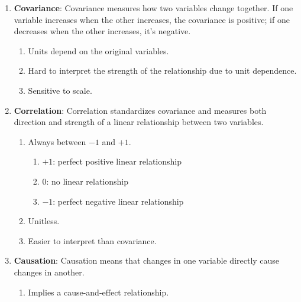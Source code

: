\begin{enumerate}
    \item \textbf{Covariance}: Covariance measures how two variables change together. If one variable increases when the other increases, the covariance is positive; if one decreases when the other increases, it's negative.
    \hfill \cite{common/online/chatgpt}
    \begin{enumerate}
        \item Units depend on the original variables.
        \hfill \cite{common/online/chatgpt}

        \item Hard to interpret the strength of the relationship due to unit dependence.
        \hfill \cite{common/online/chatgpt}

        \item Sensitive to scale.
        \hfill \cite{common/online/chatgpt}
    \end{enumerate}

    \item \textbf{Correlation}: Correlation standardizes covariance and measures both direction and strength of a linear relationship between two variables.
    \hfill \cite{common/online/chatgpt}
    \begin{enumerate}
        \item Always between $-1$ and $+1$.
        \hfill \cite{common/online/chatgpt}

        \begin{enumerate}
            \item $+1$: perfect positive linear relationship
            \hfill \cite{common/online/chatgpt}

            \item $0$: no linear relationship
            \hfill \cite{common/online/chatgpt}

            \item $-1$: perfect negative linear relationship
            \hfill \cite{common/online/chatgpt}
        \end{enumerate}

        \item Unitless.
        \hfill \cite{common/online/chatgpt}

        \item Easier to interpret than covariance.
        \hfill \cite{common/online/chatgpt}
    \end{enumerate}

    \item \textbf{Causation}: Causation means that changes in one variable directly cause changes in another.
    \hfill \cite{common/online/chatgpt}
    \begin{enumerate}
        \item Implies a cause-and-effect relationship.
        \hfill \cite{common/online/chatgpt}


\end{enumerate}
\end{enumerate}

